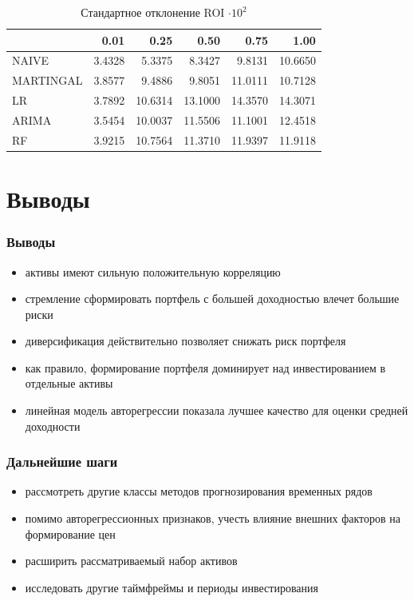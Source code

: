 \documentclass{beamer}
\begin{document}
\begin{frame}
    \begin{table}[H]
        \caption{Стандартное отклонение ROI $\cdot 10^2$}
        \label{tab:roi_std}
        \begin{tabular}{lrrrrr}
            \toprule
            &  0.01 &  0.25 &  0.50 &  0.75 &  1.00 \\
            \midrule
            NAIVE & 3.4328 & 5.3375 & 8.3427 & 9.8131 & 10.6650 \\
            MARTINGAL & 3.8577 & 9.4886 & 9.8051 & 11.0111 & 10.7128 \\
            LR & 3.7892 & 10.6314 & 13.1000 & 14.3570 & 14.3071 \\
            ARIMA & 3.5454 & 10.0037 & 11.5506 & 11.1001 & 12.4518 \\
            RF & 3.9215 & 10.7564 & 11.3710 & 11.9397 & 11.9118 \\
            \bottomrule
        \end{tabular}
    \end{table}
\end{frame}

\section{Выводы}

\begin{frame}
    \frametitle{Выводы}
    \begin{itemize}
        \item активы имеют сильную положительную корреляцию
        \item стремление сформировать портфель с большей доходностью влечет большие риски
        \item диверсификация действительно позволяет снижать риск портфеля
        \item как правило, формирование портфеля доминирует над инвестированием в отдельные активы
        \item линейная модель авторегрессии показала лучшее качество для оценки средней доходности
    \end{itemize}
\end{frame}

\begin{frame}
    \frametitle{Дальнейшие шаги}
    \begin{itemize}
        \item рассмотреть другие классы методов прогнозирования временных рядов
        \item помимо авторегрессионных признаков, учесть влияние внешних факторов на формирование цен
        \item расширить рассматриваемый набор активов
        \item исследовать другие таймфреймы и периоды инвестирования
    \end{itemize}
    \cite{skforecast}
\end{frame}
\end{document}
